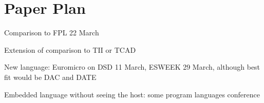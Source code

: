 \documentclass[10pt, technote, draftcls, onecolumn]{IEEEtran}
\begin{document}



\section{Paper Plan}

Comparison to FPL 22 March

Extension of comparison to TII or TCAD

New language: Euromicro on DSD 11 March, ESWEEK 29 March, although best fit would be DAC and DATE

Embedded language without seeing the host: some program languages conference
\end{document}
